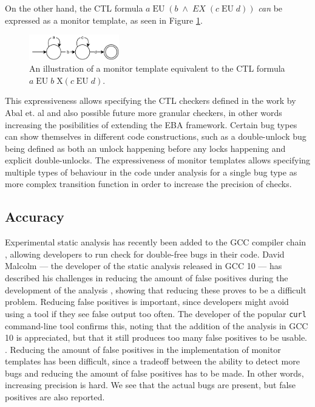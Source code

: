 \newpar On the other hand, the CTL formula $a\;\text{EU}\;(b\;\land\;EX\;(c\;\text{EU}\;d))$ \textit{can} be expressed as a monitor template, as seen in Figure \ref{ctl-as-monitor}. 

\begin{figure}[H]
    \centering
    \includegraphics[width=0.35\textwidth]{evaluation/figures/ctl-as-monitor}
    \caption{An illustration of a monitor template equivalent to the CTL formula $a\;\text{EU}\;b\;\text{X}(c\;\text{EU}\;d)$.}
    \label{ctl-as-monitor}
\end{figure}

\newpar This expressiveness allows specifying the CTL checkers defined in the work by Abal et. al and also possible future more granular checkers, in other words increasing the posibilities of extending the EBA framework. Certain bug types can show themselves in different code constructions, such as a double-unlock bug being defined as both an unlock happening before any locks happening and explicit double-unlocks. The expressiveness of monitor templates allows specifying multiple types of behaviour in the code under analysis for a single bug type as more complex transition function in order to increase the precision of checks.

\subsection{Accuracy}

Experimental static analysis has recently been added to the GCC compiler chain \cite{gcc10}, allowing developers to run check for double-free bugs in their code. David Malcolm --- the developer of the static analysis released in GCC 10 --- has described his challenges in reducing the amount of false positives during the development of the analysis \cite{gcc10-development}, showing that reducing these proves to be a difficult problem. Reducing false positives is important, since developers might avoid using a tool if they see false output too often. The developer of the popular \texttt{curl} command-line tool confirms this, noting that the addition of the analysis in GCC 10 is appreciated, but that it still produces too many false positives to be usable. \cite{curl-static-analysis}. Reducing the amount of false positives in the implementation of monitor templates has been difficult, since a tradeoff between the ability to detect more bugs and reducing the amount of false positives has to be made. In other words, increasing precision is hard. We see that the actual bugs are present, but false positives are also reported. 

